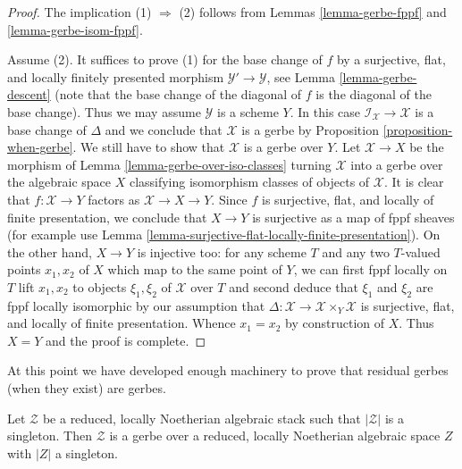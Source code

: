 \begin{proof}
The implication (1) $\Rightarrow$ (2) follows from
Lemmas \ref{lemma-gerbe-fppf} and \ref{lemma-gerbe-isom-fppf}.

\medskip\noindent
Assume (2). It suffices to prove (1) for the base change of $f$
by a surjective, flat, and locally finitely presented morphism
$\mathcal{Y}' \to \mathcal{Y}$, see
Lemma \ref{lemma-gerbe-descent} (note that the base change
of the diagonal of $f$ is the diagonal of the base change). 
Thus we may assume $\mathcal{Y}$ is a scheme $Y$.
In this case $\mathcal{I}_\mathcal{X} \to \mathcal{X}$
is a base change of $\Delta$ and
we conclude that $\mathcal{X}$ is a gerbe
by Proposition \ref{proposition-when-gerbe}.
We still have to show that $\mathcal{X}$ is a gerbe over $Y$.
Let $\mathcal{X} \to X$ be the morphism of
Lemma \ref{lemma-gerbe-over-iso-classes}
turning $\mathcal{X}$ into a gerbe over the algebraic space $X$
classifying isomorphism classes of objects of $\mathcal{X}$.
It is clear that $f : \mathcal{X} \to Y$ factors as
$\mathcal{X} \to X \to Y$. Since $f$ is surjective, flat, and
locally of finite presentation, we conclude that $X \to Y$ is
surjective as a map of fppf sheaves (for example use
Lemma \ref{lemma-surjective-flat-locally-finite-presentation}).
On the other hand, $X \to Y$ is injective too: for any scheme
$T$ and any two $T$-valued points $x_1, x_2$ of $X$ which map to
the same point of $Y$, we can first fppf locally on $T$
lift $x_1, x_2$ to objects $\xi_1, \xi_2$ of $\mathcal{X}$ over $T$
and second deduce that $\xi_1$ and $\xi_2$ are fppf locally isomorphic
by our assumption that
$\Delta : \mathcal{X} \to \mathcal{X} \times_Y \mathcal{X}$
is surjective, flat, and locally of finite presentation.
Whence $x_1 = x_2$ by construction of $X$.
Thus $X = Y$ and the proof is complete.
\end{proof}

\noindent
At this point we have developed enough machinery to prove that residual
gerbes (when they exist) are gerbes.

\begin{lemma}
\label{lemma-noetherian-singleton-stack-gerbe}
Let $\mathcal{Z}$ be a reduced, locally Noetherian algebraic stack
such that $|\mathcal{Z}|$ is a singleton. Then $\mathcal{Z}$ is a gerbe
over a reduced, locally Noetherian algebraic space $Z$ with $|Z|$ a
singleton.
\end{lemma}

